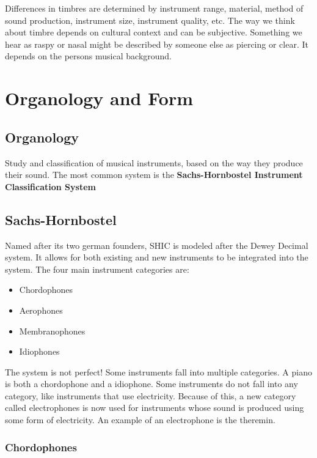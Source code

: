 \documentclass[12pt, a4paper]{report}
\begin{document}
  Differences in timbres are determined by instrument range, material, method of sound production, instrument size, instrument quality, etc. The way we think about timbre depends on cultural context and can be subjective. Something we hear as raspy or nasal might be described by someone else as piercing or clear. It depends on the persons musical background.






  \chapter{Organology and Form}

  \section{Organology}

  Study and classification of musical instruments, based on the way they produce their sound. The most common system is the \textbf{Sachs-Hornbostel Instrument Classification System}

  \section{Sachs-Hornbostel}

  Named after its two german founders, SHIC is modeled after the Dewey Decimal system. It allows for both existing and new instruments to be integrated into the system. The four main instrument categories are:

  \begin{itemize}
    \item Chordophones
    \item Aerophones
    \item Membranophones
    \item Idiophones
  \end{itemize}

  The system is not perfect! Some instruments fall into multiple categories. A piano is both a chordophone and a idiophone. Some instruments do not fall into any category, like instruments that use electricity. Because of this, a new category called electrophones is now used for instruments whose sound is produced using some form of electricity. An example of an electrophone is the theremin.

  \subsection{Chordophones}
\end{document}
